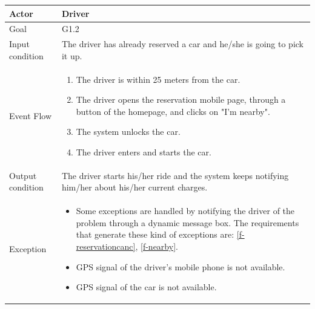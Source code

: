 \begin{table}[H]
	\begin{center}
		\begin{tabular}{| l | p{} |}
			\hline
			Actor & Driver \\
			\hline
			Goal & G1.2
			\\
			\hline
			Input condition & The driver has already reserved a car and he/she is going to pick it up.  \\
			\hline
			Event Flow & \begin{enumerate}
				\item The driver is within 25 meters from the car.
				\item The driver opens the reservation mobile page, through a button of the homepage, and clicks on "I'm nearby".
				\item The system unlocks the car.
				\item The driver enters and starts the car. 
			\end{enumerate}
			\\
			\hline
			Output condition & The driver starts his/her ride and the system keeps notifying him/her about his/her current charges. \\
			\hline
			
			Exception &  \begin{itemize}
				\item Some exceptions are handled by notifying the driver of the problem through a dynamic message box.				
				The requirements that generate these kind of exceptions are:
				\ref{f-reservationcanc},    %
				\ref{f-nearby}.    %
				\item GPS signal of the driver's mobile phone is not available.
				\item GPS signal of the car is not available.		
			\end{itemize}
			\\
			\hline
		\end{tabular}
	\end{center}
\end{table}

